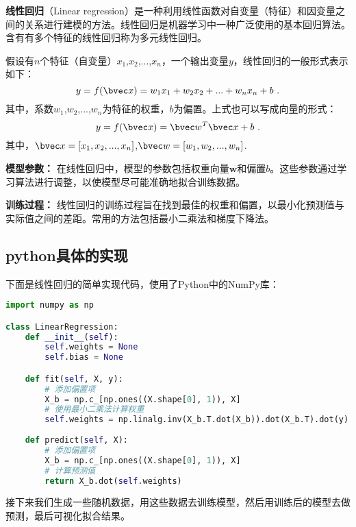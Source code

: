 

\textbf{线性回归}（Linear regression）是一种利用线性函数对自变量（特征）和因变量之间的关系进行建模的方法。线性回归是机器学习中一种广泛使用的基本回归算法。含有有多个特征的线性回归称为多元线性回归。

假设有$n$个特征（自变量）$x_1$,$x_2$,...,$x_n$，一个输出变量$y$，线性回归的一般形式表示如下：
\begin{equation}
y=f(\bvec x)=w_1x_1+w_2x_2+...+w_nx_n+b~.
\end{equation}
其中，系数$w_1$,$w_2$,...,$w_n$为特征的权重，$b$为偏置。上式也可以写成向量的形式：
\begin{equation}
y=f(\bvec x)=\bvec w^T\bvec x+b~.
\end{equation}
其中，$\bvec x = [x_1,x_2,...,x_n]$,$\bvec w = [w_1,w_2,...,w_n]$.

\textbf{模型参数：} 在线性回归中，模型的参数包括权重向量$\mathbf{w}$和偏置$b$。这些参数通过学习算法进行调整，以使模型尽可能准确地拟合训练数据。

\textbf{训练过程：} 线性回归的训练过程旨在找到最佳的权重和偏置，以最小化预测值与实际值之间的差距。常用的方法包括最小二乘法和梯度下降法。


\subsection{python具体的实现}
下面是线性回归的简单实现代码，使用了Python中的NumPy库：
\begin{lstlisting}[language=python]
import numpy as np

class LinearRegression:
    def __init__(self):
        self.weights = None
        self.bias = None

    def fit(self, X, y):
        # 添加偏置项
        X_b = np.c_[np.ones((X.shape[0], 1)), X]
        # 使用最小二乘法计算权重
        self.weights = np.linalg.inv(X_b.T.dot(X_b)).dot(X_b.T).dot(y)
        
    def predict(self, X):
        # 添加偏置项
        X_b = np.c_[np.ones((X.shape[0], 1)), X]
        # 计算预测值
        return X_b.dot(self.weights)
\end{lstlisting}

接下来我们生成一些随机数据，用这些数据去训练模型，然后用训练后的模型去做预测，最后可视化拟合结果。

